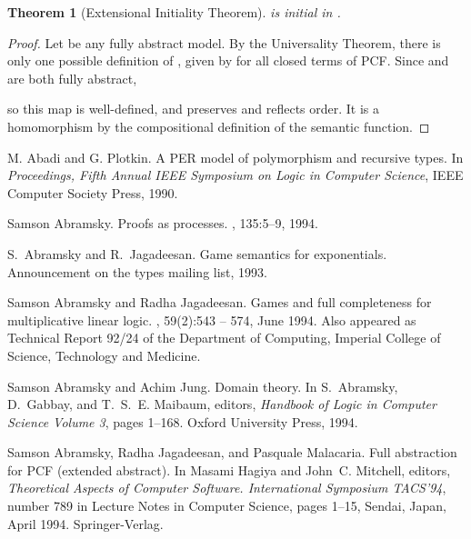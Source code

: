 \documentclass[11pt]{article}
\newtheorem{theorem}{Theorem}[section]
\begin{document}
\begin{theorem}[Extensional Initiality Theorem]


 is initial in .
\end{theorem}
\newcommand{\N}{{\cal N}}
\begin{proof} Let  be any fully abstract model. By the
Universality Theorem, there is only one possible definition of
, given by  for
all closed terms  of PCF. Since  and 
are both fully abstract,

so this map is well-defined, and preserves and reflects order. It
is a homomorphism by the compositional definition of the semantic
function.
\end{proof}






\begin{thebibliography}{Cur92b}

M. Abadi and G. Plotkin.
\newblock A {\sc PER} model of polymorphism and recursive types.
\newblock  In {\em Proceedings, Fifth Annual IEEE Symposium on Logic in Computer
  Science}, IEEE Computer Society Press, 1990.

Samson Abramsky.
\newblock Proofs as processes.
, 135:5--9, 1994.

S.~Abramsky and R.~Jagadeesan.
\newblock Game semantics for exponentials.
\newblock Announcement on the types mailing list, 1993.

Samson Abramsky and Radha Jagadeesan.
\newblock Games and full completeness for multiplicative linear logic.
, 59(2):543 -- 574, June 1994.
\newblock Also appeared as Technical Report 92/24 of the Department of
  Computing, Imperial College of Science, Technology and Medicine.

Samson Abramsky and Achim Jung.
\newblock Domain theory.
\newblock In S.~Abramsky, D.~Gabbay, and T.~S.~E. Maibaum, editors, {\em
  Handbook of Logic in Computer Science Volume 3}, pages 1--168. Oxford
  University Press, 1994.

Samson Abramsky, Radha Jagadeesan, and Pasquale Malacaria.
\newblock Full abstraction for {PCF} (extended abstract).
\newblock In Masami Hagiya and John~C. Mitchell, editors, {\em Theoretical
  Aspects of Computer Software. International Symposium TACS'94}, number 789 in
  Lecture Notes in Computer Science, pages 1--15, Sendai, Japan, April 1994.
  Springer-Verlag.


\end{thebibliography}
\end{document}

